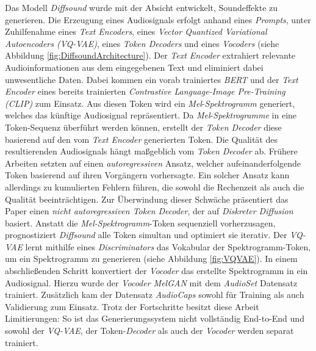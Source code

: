 \documentclass[
  a4paper,  %
  twoside,  %
  bibliography=totoc,
  headsepline,
  cleardoublepage=empty,
  parskip=half,
  draft=false
]{scrbook}
\begin{document}
Das Modell \emph{Diffsound} \cite{yang_diffsound_2023} wurde mit der Absicht entwickelt, Soundeffekte zu generieren. Die Erzeugung eines Audiosignals erfolgt anhand eines \emph{Prompts}, unter Zuhilfenahme eines \emph{Text Encoders}, eines \emph{Vector Quantized Variational Autoencoders (\emph{VQ-VAE})}, eines \emph{Token Decoders} und eines \emph{Vocoders} (siehe Abbildung \ref{fig:DiffsoundArchitecture}). Der \emph{Text Encoder} extrahiert relevante Audioinformationen aus dem eingegebenen Text und eliminiert dabei unwesentliche Daten. Dabei kommen ein vorab trainiertes \emph{BERT} \cite{devlin_bert_2019} und der \emph{Text Encoder} eines bereits trainierten \emph{Contrastive Language-Image Pre-Training (CLIP)} \cite{radford_learning_2021} zum Einsatz. Aus diesen Token wird ein \emph{Mel}-\emph{Spektrogramm} generiert, welches das künftige Audiosignal repräsentiert. Da \emph{Mel}-\emph{Spektrogramme} in eine Token-Sequenz überführt werden können, erstellt der \emph{Token Decoder} diese basierend auf den vom \emph{Text Encoder} generierten Token. Die Qualität des resultierenden Audiosignals hängt maßgeblich vom \emph{Token Decoder} ab. Frühere Arbeiten \cite{liu_conditional_2021, iashin_taming_2021} setzten auf einen \emph{autoregressiven} Ansatz, welcher aufeinanderfolgende Token basierend auf ihren Vorgängern vorhersagte. Ein solcher Ansatz kann allerdings zu kumulierten Fehlern führen, die sowohl die Rechenzeit als auch die Qualität beeinträchtigen. Zur Überwindung dieser Schwäche präsentiert das Paper einen \emph{nicht autoregressiven Token Decoder}, der auf \emph{Diskreter Diffusion} \cite{sohl-dickstein_deep_2015, austin_structured_2023} basiert. Anstatt die \emph{Mel-Spektrogramm}-Token sequenziell vorherzusagen, prognostiziert \emph{Diffsound} alle Token simultan und optimiert sie iterativ. Der \emph{VQ-VAE} \cite{oord_neural_2018} lernt mithilfe eines \emph{Discriminators} das Vokabular der Spektrogramm-Token, um ein Spektrogramm zu generieren (siehe Abbildung \ref{fig:VQVAE}). In einem abschließenden Schritt konvertiert der \emph{Vocoder} das erstellte Spektrogramm in ein Audiosignal. Hierzu wurde der \emph{Vocoder MelGAN} \cite{kumar_melgan_2019} mit dem \emph{AudioSet} \cite{gemmeke_audio_2017} Datensatz trainiert. Zusätzlich kam der Datensatz \emph{AudioCaps} \cite{kim_audiocaps_2019} sowohl für Training als auch Validierung zum Einsatz. Trotz der Fortschritte besitzt diese Arbeit Limitierungen: So ist das Generierungssystem nicht vollständig End-to-End und sowohl der \emph{VQ-VAE}, der Token-\emph{Decoder} als auch der \emph{Vocoder} werden separat trainiert. \cite{yang_diffsound_2023}
\end{document}
